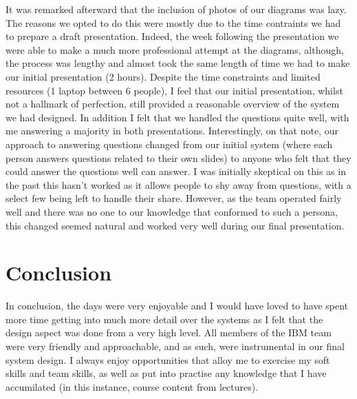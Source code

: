 \documentclass[12pt]{article} %
\begin{document}
It was remarked afterward that the inclusion of photos of our diagrams was lazy. The reasons we opted to do this were mostly due to the time contraints we had to prepare a draft presentation. Indeed, the week following the presentation we were able to make a much more professional attempt at the diagrams, although, the process was lengthy and almost took the same length of time we had to make our initial presentation (2 hours). Despite the time constraints and limited resources (1 laptop between 6 people), I feel that our initial presentation, whilst not a hallmark of perfection, still provided a reasonable overview of the system we had designed. In addition I felt that we handled the questions quite well, with me answering a majority in both presentations. Interestingly, on that note, our approach to answering questions changed from our initial system (where each person answers questions related to their own slides) to anyone who felt that they could answer the questions well can answer. I was initially skeptical on this as in the past this hasn't worked as it allows people to shy away from questions, with a select few being left to handle their share. However, as the team operated fairly well and there was no one to our knowledge that conformed to such a persona, this changed seemed natural and worked very well during our final presentation.

\section{Conclusion}

In conclusion, the days were very enjoyable and I would have loved to have spent more time getting into much more detail over the systems as I felt that the design aspect was done from a very high level. All members of the IBM team were very friendly and approachable, and as such, were instrumental in our final system design. I always enjoy opportunities that alloy me to exercise my soft skills and team skills, as well as put into practise any knowledge that I have accumilated (in this instance, course content from lectures). 
\end{document}
